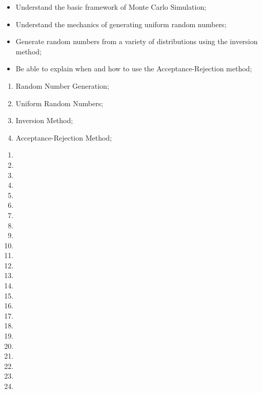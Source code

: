 \documentclass[12pt, titlepage, french]{report}
\begin{document}
\begin{outcomes}
\begin{enumerate}
		\begin{itemize}
		\item	Understand the basic framework of Monte Carlo Simulation;
		\item	Understand the mechanics of generating uniform random numbers;
		\item	Generate random numbers from a variety of distributions using the inversion method;
		\item	Be able to explain when and how to use the Acceptance-Rejection method;
		\end{itemize}
	\begin{knowledge}
	\begin{enumerate}[label = \alph*.]
		\item	Random Number Generation;
		\item	Uniform Random Numbers;
		\item	Inversion Method;
		\item	Acceptance-Rejection Method;
	\end{enumerate}
	\end{knowledge}
\end{enumerate}
\end{outcomes}

\begin{ASM_chapter}
\begin{enumerate}
	\item	{}
	\item	{}
	\item	{}
\tcbline
	\item	{}
	\item	{}
	\item	{}
	\item	{}
	\item	{}
	\item	{}
	\item	{}
	\item	{}
	\item	{}
	\item	{}
	\item	{}
	\item	{}
	\item	{}
	\item	{}
	\item	{}
	\item	{}
\tcbline
	\item	{}
	\item	{}
\tcbline
	\item	{}
	\item	{}
	\item	{}
\end{enumerate}
\end{ASM_chapter}
\end{document}
